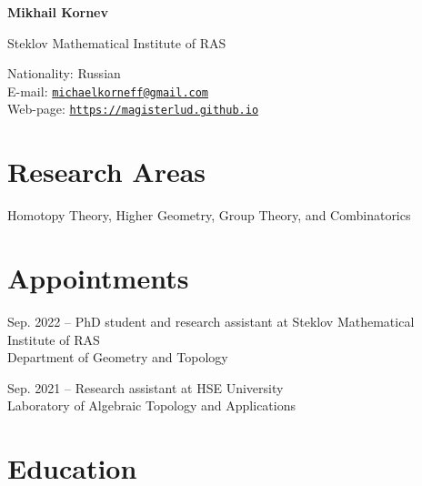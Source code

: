 \documentclass[11pt,letterpaper]{report}
\newcommand{\myname}{Mikhail Kornev}
\newcommand{\namefont}[1]{{\normalfont\bfseries\Huge{#1}}}
\begin{document}
    \raggedright{}

    \namefont{\myname}

    \vspace{1em}
    \begin{minipage}[t]{2.5in}
        Steklov Mathematical Institute of RAS 
    \end{minipage}
    \hfill
    \begin{minipage}[t]{3in}
        Nationality: Russian\\
        E-mail: \href{mailto:michaelkorneff@gmail.com}{\tt michaelkorneff@gmail.com}\\
        Web-page: \href{https://magisterlud.github.io}{\tt https://magisterlud.github.io}
    \end{minipage}
    
    \section*{Research Areas}

   Homotopy Theory, Higher Geometry, Group Theory, and Combinatorics    
    
    
    
     \section*{Appointments}

    \begin{tablist}

        \item[Sep. 2022 --]   \tab{}PhD student and research assistant at Steklov Mathematical Institute of RAS  \\
                              Department of Geometry and Topology

        \item[Sep. 2021 --]  \tab{}Research assistant at HSE University \\
                              Laboratory of Algebraic Topology and Applications

    \end{tablist}




    \section*{Education}
\end{document}
